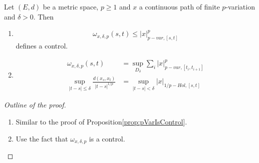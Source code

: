\begin{proposition}\label{prop:deltaPvar}
    Let $(E,d)$ be a metric space, $p \geq 1$ and $x$ a continuous path of finite $p$-variation and $\delta > 0.$ Then
    \begin{enumerate}
        \item \begin{equation}
            \omega_{x,\delta,p}(s,t) \leq |x|_{p-var,[s,t]}^p
        \end{equation}
        defines a control.
        \item \begin{align}
            \omega_{x,\delta,p}(s,t) &= \sup_{D_\delta} \sum_i |x|_{p-var,[t_i,t_{i+1}]}^p \\
            \sup_{|t - s| \leq \delta} \frac{d(x_s, x_t)}{|t - s|^{1/p}} &= \sup_{|t - s| < \delta} |x|_{1/p-Hol, [s,t]}
        \end{align}
    \end{enumerate}
\end{proposition}
\begin{proof}[Outline of the proof]
    \begin{enumerate}
        \item Similar to the proof of Proposition\ref{prop:pVarIsControl}.
        \item Use the fact that $\omega_{x,\delta,p}$ is a control.
    \end{enumerate}
\end{proof}

